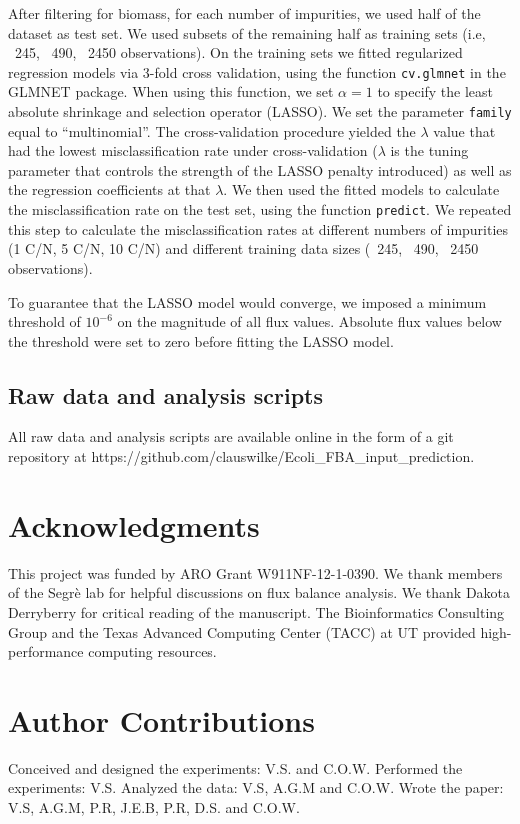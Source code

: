 \documentclass[12pt]{article}
\begin{document}
After filtering for biomass, for each number of impurities, we used half of the dataset as test set. We used subsets of the remaining half as training sets (i.e, ~245, ~490, ~2450 observations). On the training sets we fitted regularized regression models via 3-fold cross validation, using the function \texttt{cv.glmnet} in the GLMNET package. When using this function, we set $\alpha=1$ to specify the least absolute shrinkage and selection operator (LASSO). We set the parameter \texttt{family} equal to ``multinomial''. The cross-validation procedure yielded the  $\lambda$ value that had the lowest misclassification rate under cross-validation ($\lambda$ is the tuning parameter that controls the strength of the LASSO penalty introduced) as well as the regression coefficients at that $\lambda$. We then used the fitted models to calculate the misclassification rate on the test set, using the function \texttt{predict}. We repeated this step to calculate the misclassification rates at different numbers of impurities (1 C/N, 5 C/N, 10 C/N) and different training data sizes (~245, ~490, ~2450 observations).

To guarantee that the LASSO model would converge, we imposed a minimum threshold of $10^{-6}$ on the magnitude of all flux values. Absolute flux values below the threshold were set to zero before fitting the LASSO model.

\subsection*{Raw data and analysis scripts}

All raw data and analysis scripts are available online in the form of a git repository at https://github.com/clauswilke/Ecoli\_FBA\_input\_prediction.

\section*{Acknowledgments}
This project was funded by ARO Grant W911NF-12-1-0390. We thank members of the Segr\`e lab for helpful discussions on flux balance analysis. We thank Dakota Derryberry for critical reading of the manuscript. The Bioinformatics Consulting Group and the Texas Advanced Computing Center (TACC) at UT provided high-performance computing resources. 

\section*{Author Contributions}
Conceived and designed the experiments: V.S. and C.O.W. Performed the experiments: V.S. Analyzed the data: V.S, A.G.M and C.O.W. Wrote the paper: V.S, A.G.M, P.R, J.E.B, P.R, D.S. and C.O.W.
\end{document}

